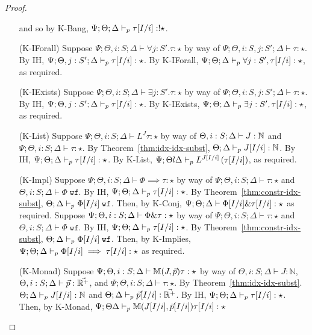 \begin{proof}
\begin{enumerate}
  and so by K-Bang,
  $\Psi ; \Theta ; \Delta \vdash_p \tau[I/i] : !\star$.
  \item[(K-IForall)] Suppose $\Psi ; \Theta, i : S;  \Delta \vdash \forall j : S'. \tau : \star$ by way of
  $\Psi ; \Theta, i : S, j : S' ; \Delta \vdash \tau : \star$.
  By IH,
  $\Psi ; \Theta, j : S' ; \Delta \vdash_p \tau[I/i] : \star$.
  By K-IForall,
  $\Psi ; \Theta ; \Delta \vdash_p \forall j : S', \tau[I/i] : \star$, as required.
  \item[(K-IExists)] Suppose $\Psi ; \Theta, i : S;  \Delta \vdash \exists j : S'. \tau : \star$ by way of
  $\Psi ; \Theta, i : S, j : S' ; \Delta \vdash \tau : \star$.
  By IH,
  $\Psi ; \Theta, j : S' ; \Delta \vdash_p \tau[I/i] : \star$.
  By K-IExists,
  $\Psi ; \Theta ; \Delta \vdash_p \exists j : S', \tau[I/i] : \star$, as required.
  \item[(K-List)] Suppose $\Psi ; \Theta, i : S ; \Delta \vdash L^J \tau : \star$ by way of
  $\Theta, i : S ; \Delta \vdash J : \mathbb{N}$ and
  $\Psi ; \Theta, i : S ; \Delta \vdash \tau : \star$.
  By Theorem~\ref{thm:idx-idx-subst},
  $\Theta ; \Delta \vdash_p J[I/i] : \mathbb{N}$.
  By IH,
  $\Psi ; \Theta ; \Delta \vdash_p \tau[I/i] : \star$.
  By K-List,
  $\Psi ; \Theta l \Delta \vdash_p L^{J[I/i]}\left(\tau[I/i]\right)$,
  as required.
  
  \item[(K-Impl)] Suppose $\Psi ; \Theta, i : S ; \Delta \vdash \Phi \implies \tau : \star$ by way of
  $\Psi ; \Theta, i : S ; \Delta \vdash \tau : \star$ and
  $\Theta, i : S ; \Delta \vdash \Phi \; \texttt{wf}$.
  By IH,
  $\Psi ; \Theta ; \Delta \vdash_p \tau[I/i] : \star$.
  By Theorem~\ref{thm:constr-idx-subst},
  $\Theta ; \Delta \vdash_p \Phi[I/i] \; \texttt{wf}$.
  Then, by K-Conj,
  $\Psi ; \Theta ; \Delta \vdash \Phi[I/i] \& \tau[I/i] : \star$
  as required.
  Suppose $\Psi ; \Theta, i : S ; \Delta \vdash \Phi \& \tau : \star$ by way of
  $\Psi ; \Theta, i : S ; \Delta \vdash \tau : \star$ and
  $\Theta, i : S ; \Delta \vdash \Phi \; \texttt{wf}$.
  By IH,
  $\Psi ; \Theta ; \Delta \vdash_p \tau[I/i] : \star$.
  By Theorem~\ref{thm:constr-idx-subst},
  $\Theta ; \Delta \vdash_p \Phi[I/i] \; \texttt{wf}$.
  Then, by K-Implies,
  $\Psi ; \Theta ; \Delta \vdash_p \Phi[I/i] \implies \tau[I/i] : \star$
  as required.
  
  \item[(K-Monad)] Suppose
  $\Psi ; \Theta, i : S ; \Delta \vdash \mathbb{M}(J,\vec{p}) \tau : \star$
  by way of
  $\Theta, i : S ; \Delta \vdash J : \mathbb{N}$,
  $\Theta, i : S ; \Delta \vdash \vec{p} : \vec{\mathbb{R}^+}$, and
  $\Psi ; \Theta, i : S ; \Delta \vdash \tau : \star$.
  By Theorem~\ref{thm:idx-idx-subst}.
  $\Theta ; \Delta \vdash_p J[I/i] : \mathbb{N}$ and
  $\Theta ; \Delta \vdash_p \vec{p}[I/i] : \vec{\mathbb{R}^+}$.
  By IH,
  $\Psi ; \Theta ; \Delta \vdash_p \tau[I/i] : \star$.
  Then, by K-Monad,
  $\Psi ; \Theta  \Delta \vdash_p \mathbb{M}(J[I/i],\vec{p}[I/i]) \tau[I/i] : \star$
  

\end{enumerate}
\end{proof}
